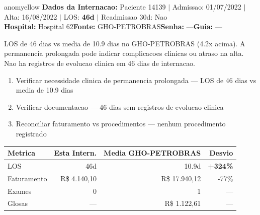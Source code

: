 \documentclass[a4paper,10pt]{article}
\begin{document}
\begin{anomalycard}[Internacao 15335 | GHO-PETROBRAS | MODERADO (z=2.49)]{anomyellow}
\textbf{Dados da Internacao:} Paciente 14139 $\mid$ Admissao: 01/07/2022 $\mid$ Alta: 16/08/2022 $\mid$ LOS: \textbf{46d} $\mid$ Readmissao 30d: Nao\\
\textbf{Hospital:} Hospital 62\quad\textbf{Fonte:} GHO-PETROBRAS\quad\textbf{Senha:} ---\quad\textbf{Guia:} ---\\
\vspace{2pt}\begin{tcolorbox}[colback=severityred!20,colframe=anomyellow,title={\textbf{Interpretacao de Negocio}},fonttitle=\bfseries\small,left=4pt,right=4pt,top=3pt,bottom=3pt]
{\small LOS de 46 dias vs media de 10.9 dias no GHO-PETROBRAS (4.2x acima). A permanencia prolongada pode indicar complicacoes clinicas ou atraso na alta. Nao ha registros de evolucao clinica em 46 dias de internacao.}
\end{tcolorbox}
\begin{tcolorbox}[colback=severityyellow!30,colframe=anomorange,title={\textbf{Recomendacoes Especificas}},fonttitle=\bfseries\small,left=4pt,right=4pt,top=3pt,bottom=3pt]
\begin{enumerate}[nosep,leftmargin=16pt]
\item {\small Verificar necessidade clinica de permanencia prolongada --- LOS de 46 dias vs media de 10.9 dias}
\item {\small Verificar documentacao --- 46 dias sem registros de evolucao clinica}
\item {\small Reconciliar faturamento vs procedimentos --- nenhum procedimento registrado}
\end{enumerate}
\end{tcolorbox}
\begin{center}\begin{tabular}{l r r r}\toprule\textbf{Metrica} & \textbf{Esta Intern.} & \textbf{Media GHO-PETROBRAS} & \textbf{Desvio} \\\midrule
LOS & 46d & 10.9d & \textcolor{anomred}{\textbf{+324\%}} \\
Faturamento & R\$ 4.140,10 & R\$ 17.940,12 & -77\% \\
Exames & 0 & 1 & --- \\
Glosas & --- & R\$ 1.122,61 & --- \\
\bottomrule\end{tabular}\end{center}


\end{anomalycard}
\end{document}

